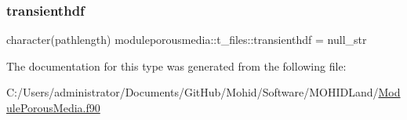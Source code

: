 \mbox{\label{structmoduleporousmedia_1_1t__files_a7a6ac61c7f9380b7ee5d8dab74309105}} 
\subsubsection{\texorpdfstring{transienthdf}{transienthdf}}
{\footnotesize\ttfamily character(pathlength) moduleporousmedia\+::t\+\_\+files\+::transienthdf = null\+\_\+str\hspace{0.3cm}{\ttfamily [private]}}



The documentation for this type was generated from the following file\+:\begin{DoxyCompactItemize}
\item 
C\+:/\+Users/administrator/\+Documents/\+Git\+Hub/\+Mohid/\+Software/\+M\+O\+H\+I\+D\+Land/\mbox{\hyperlink{_module_porous_media_8f90}{Module\+Porous\+Media.\+f90}}\end{DoxyCompactItemize}
